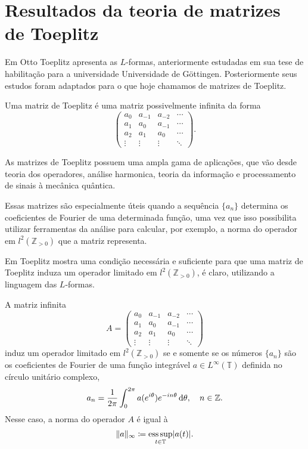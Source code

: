 \section{Resultados da teoria de matrizes de Toeplitz} \vspace{1cm}

\par Em \cite{Toeplitz1911} Otto Toeplitz apresenta as $L$-formas, anteriormente estudadas em sua tese de habilitação para a universidade Universidade de Göttingen. Posteriormente seus estudos foram adaptados para o que hoje chamamos de matrizes de Toeplitz.

Uma matriz de Toeplitz é uma matriz possivelmente infinita da forma \[ \begin{pmatrix} a_{0} & a_{-1} & a_{-2} & \cdots \\ a_{1} & a_{0} & a_{-1} & \cdots \\ a_2 & a_{1} & a_{0} & \cdots \\ \vdots & \vdots & \vdots & \ddots \end{pmatrix}\text{.} \]

As matrizes de Toeplitz possuem uma ampla gama de aplicações, que vão desde teoria dos operadores, análise harmonica, teoria da informação e processamento de sinais à mecânica quântica.

Essas matrizes são especialmente úteis quando a sequência $\{a_n\}$ determina os coeficientes de Fourier de uma determinada função, uma vez que isso possibilita utilizar ferramentas da análise para calcular, por exemplo, a norma do operador em $l^2(\mathbb{Z}_{> 0})$ que a matriz representa.

Em \cite{Toeplitz1911} Toeplitz mostra uma condição necessária e suficiente para que uma matriz de Toeplitz induza um operador limitado em $l^2(\mathbb{Z}_{> 0})$, é claro, utilizando a linguagem das $L$-formas.

\begin{theorem*}
  A matriz infinita \[A = \begin{pmatrix} a_{0} & a_{-1} & a_{-2} & \cdots \\ a_{1} & a_{0} & a_{-1} & \cdots \\ a_2 & a_{1} & a_{0} & \cdots \\ \vdots & \vdots & \vdots & \ddots \end{pmatrix}\] induz um operador limitado em $l^2(\mathbb{Z}_{>0})$ se e somente se os números $\{a_n\}$ são os coeficientes de Fourier de uma função integrável $a \in L^\infty(\mathbb{T})$ definida no círculo unitário complexo, \[a_n = \frac{1}{2\pi} \int_{0}^{2\pi} a(e^{i \theta})e^{-i n \theta} \operatorname{d}\!{\theta}, \quad n \in \mathbb{Z}\text{.}\]
  Nesse caso, a norma do operador $A$ é igual à \[\|a\|_{\infty} \coloneqq \operatorname*{ess\,sup}_{t \in \mathbb{T}}\lvert a(t)\rvert\text{.}\]
\end{theorem*}

